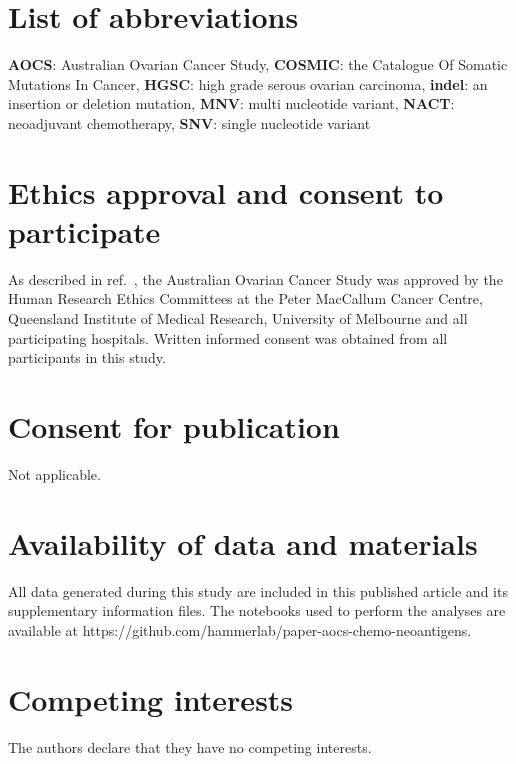 \documentclass{bmcart}
\begin{document}
\begin{backmatter}

\section*{List of abbreviations}
\textbf{AOCS}: Australian Ovarian Cancer Study, \textbf{COSMIC}: the Catalogue Of Somatic Mutations In Cancer, \textbf{HGSC}: high grade serous ovarian carcinoma, \textbf{indel}: an insertion or deletion mutation, \textbf{MNV}: multi nucleotide variant, \textbf{NACT}: neoadjuvant chemotherapy, \textbf{SNV}: single nucleotide variant

\section*{Ethics approval and consent to participate}
As described in ref.~\cite{Patch_2015}, the Australian Ovarian Cancer Study was approved by the Human Research Ethics Committees at the Peter MacCallum Cancer Centre, Queensland Institute of Medical Research, University of Melbourne and all participating hospitals. Written informed consent was obtained from all participants in this study.



\section*{Consent for publication}
Not applicable.

\section*{Availability of data and materials}
All data generated during this study are included in this published article and its supplementary information files. The notebooks used to perform the analyses are available at https://github.com/hammerlab/paper-aocs-chemo-neoantigens.

\section*{Competing interests}
  The authors declare that they have no competing interests.
  

\end{backmatter}
\end{document}
